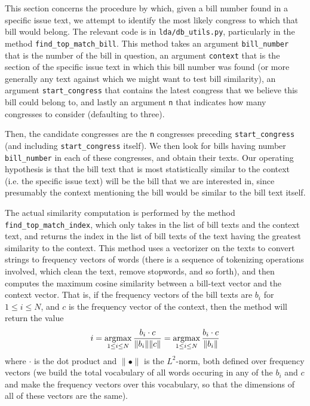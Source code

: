 \documentclass[11pt,letterpaper]{article}
\theoremstyle{plain}
\begin{document}
This section concerns the procedure by which, given a bill number
found in a specific issue text, we attempt to identify the most likely
congress to which that bill would belong.  The relevant code is in
\texttt{lda/db\_utils.py}, particularly in the method
\texttt{find\_top\_match\_bill}.  This method takes an argument
\texttt{bill\_number} that is the number of the bill in question, an
argument \texttt{context} that is the section of the specific issue
text in which this bill number was found (or more generally any text
against which we might want to test bill similarity), an argument
\texttt{start\_congress} that contains the latest congress that we
believe this bill could belong to, and lastly an argument \texttt{n}
that indicates how many congresses to consider (defaulting to three).

Then, the candidate congresses are the \texttt{n} congresses preceding
\texttt{start\_congress} (and including \texttt{start\_congress}
itself).  We then look for bills having number \texttt{bill\_number}
in each of these congresses, and obtain their texts.  Our operating
hypothesis is that the bill text that is most statistically similar to
the context (i.e. the specific issue text) will be the bill that we
are interested in, since presumably the context mentioning the bill
would be similar to the bill text itself.

The actual similarity computation is performed by the method
\texttt{find\_top\_match\_index}, which only takes in the list of bill
texts and the context text, and returns the index in the list of bill
texts of the text having the greatest similarity to the context.  This
method uses a vectorizer on the texts to convert strings to frequency
vectors of words (there is a sequence of tokenizing operations
involved, which clean the text, remove stopwords, and so forth), and
then computes the maximum cosine similarity between a bill-text vector
and the context vector.  That is, if the frequency vectors of the bill
texts are $b_i$ for $1 \leq i \leq N$, and $c$ is the frequency vector
of the context, then the method will return the value
\[ i = \argmax_{1 \leq i \leq N}\frac{b_i \cdot c}{\|b_i\|\|c\|} = \argmax_{1 \leq i \leq N}\frac{b_i \cdot c}{\|b_i\|} \]
where $\cdot$ is the dot product and $\|\bullet \|$ is the $L^2$-norm, both defined over frequency vectors (we build the total vocabulary of all words occuring in any of the $b_i$ and $c$ and make the frequency vectors over this vocabulary, so that the dimensions of all of these vectors are the same).
\end{document}
